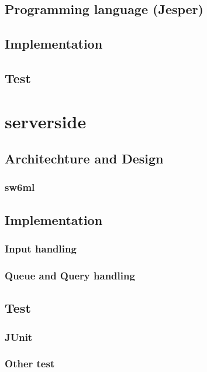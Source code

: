      \subsection{Programming language (Jesper)}
      
     \subsection{Implementation}
     \subsection{Test}

  \section{serverside} %
    
    \subsection{Architechture and Design}
      
      \subsubsection{sw6ml} %
         \label{sw6ml}
	  
	  
    \subsection{Implementation}
      \subsubsection{Input handling} %
		
      \subsubsection{Queue and Query handling} %
	  \label{QQHandling}
    \subsection{Test}
      \subsubsection{JUnit}
      \subsubsection{Other test}

